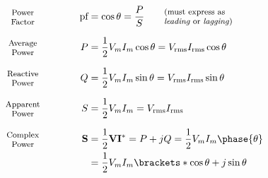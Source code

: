 \begin{multicols}{2}
\begin{CheatsheetEntryFrame}
        \begin{alignat*}{2}
            &\text{\parbox{3.5em}{\centering\footnotesize{}Power\\Factor}}
            &\qquad\quad \text{pf}
            &= \cos\theta
            = \frac{P}{S}
            \qquad \text{\parbox{7.5em}{\raggedright\footnotesize{}(must express as \emph{leading} or \emph{lagging})}}
            \\[0.7em]
            &\text{\parbox{3.5em}{\centering\footnotesize{}Average\\Power}}
            &\qquad\quad P
            &= \frac{1}{2} V_m I_m \cos{\theta}
            = V_{\text{rms}} I_{\text{rms}} \cos{\theta}
            \\[0.7em]
            &\text{\parbox{3.5em}{\centering\footnotesize{}Reactive\\Power}}
            &\qquad\quad Q
            &= \frac{1}{2} V_m I_m \sin{\theta}
            = V_{\text{rms}} I_{\text{rms}} \sin{\theta}
            \\[0.7em]
            &\text{\parbox{3.5em}{\centering\footnotesize{}Apparent\\Power}}
            &\qquad\quad S
            &= \frac{1}{2} V_m I_m
            = V_{\text{rms}} I_{\text{rms}}
            \\[0.7em]
            &\text{\parbox{3.5em}{\centering\footnotesize{}Complex\\Power}}
            &\qquad\quad \mathbf{S}
            &= \frac{1}{2} \mathbf{V} \mathbf{I}^*
            = P + j Q
            = \frac{1}{2} V_m I_m \phase{\theta}
            \\
            &&
            &= \frac{1}{2} V_m I_m \brackets*{\cos{\theta} + j \sin{\theta}}
        \end{alignat*}



\end{CheatsheetEntryFrame}
\end{multicols}
